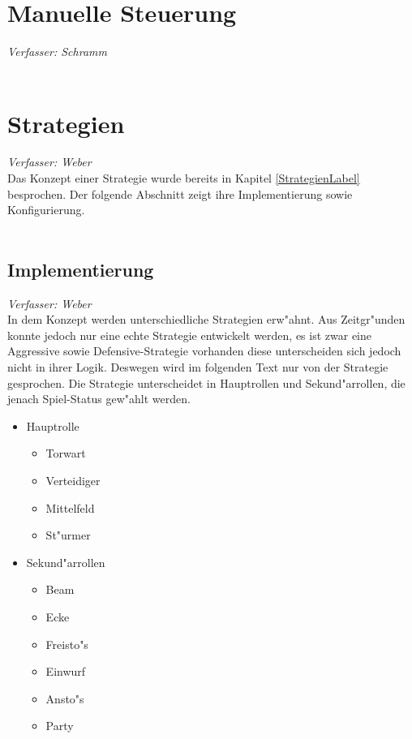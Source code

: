 \documentclass[fontsize=12pt,a4paper,final]{scrartcl}[2003/01/01]
\begin{document}
\section{Manuelle Steuerung}\label{se:Manuelle Steuerung}
\textit{Verfasser: Schramm}\\
\\


\section{Strategien}
\textit{Verfasser: Weber}\\
Das Konzept einer Strategie wurde bereits in Kapitel \ref{StrategienLabel} besprochen. Der folgende Abschnitt zeigt ihre Implementierung sowie Konfigurierung.\\
\\
\subsection{Implementierung}
\textit{Verfasser: Weber}\\
In dem Konzept werden unterschiedliche Strategien erw"ahnt. Aus Zeitgr"unden konnte jedoch nur eine echte Strategie entwickelt werden, es ist zwar eine Aggressive sowie Defensive-Strategie vorhanden diese unterscheiden sich jedoch nicht in ihrer Logik. Deswegen wird im folgenden Text nur von der Strategie gesprochen. Die Strategie unterscheidet in Hauptrollen und Sekund"arrollen, die jenach Spiel-Status gew"ahlt werden.

\begin{itemize}

\item Hauptrolle
\begin{itemize}
\item Torwart
\item Verteidiger
\item Mittelfeld
\item St"urmer
\end{itemize}

\item Sekund"arrollen
\begin{itemize}
\item Beam
\item Ecke
\item Freisto"s
\item Einwurf
\item Ansto"s
\item Party

\end{itemize}
\end{itemize}
\end{document}
